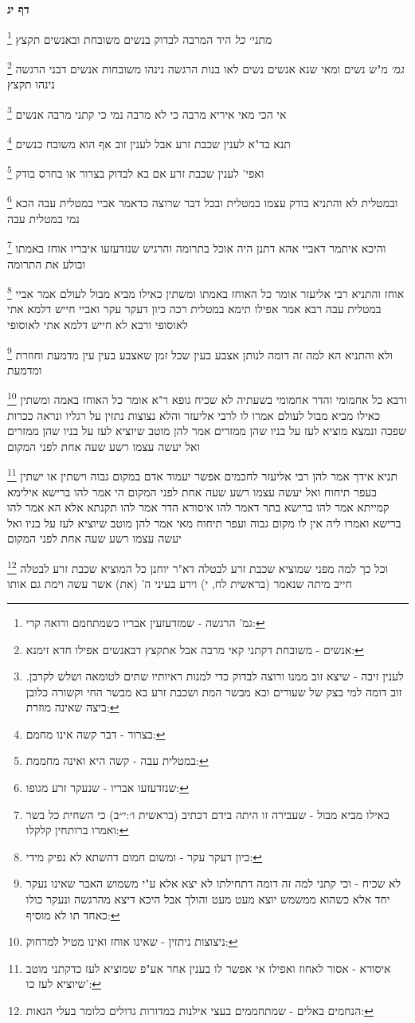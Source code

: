 \documentclass[12pt, openany]{book}
\newcommand{\sethebfont}{
\fontsize{10.5pt}{21.0pt} \selectfont
}
\newcommand{\twocol}[1]{
	{\sethebfont \begin{multicols}{2}
			#1
	\end{multicols}}	
}
\newcommand{\sectname}{}
\newcommand{\newsection}[1]{
	\renewcommand{\sectname}{#1}	
	\vspace{-\baselineskip}
	\begin{center}
		\textbf{%
\fontsize{16pt}{16pt}\selectfont
			#1}
	\end{center}
	\vspace{-\baselineskip}
	\nopagebreak
}
\newcommand{\footnotecomment}[1]{
	\renewcommand\thefootnote{}
	\footnote{#1}}
\newcommand{\commenta}[1]{\footnotecomment{#1}}
\begin{document}
\newsection{דף יג}
\twocol{
\commenta{גמ' הרגשה - שמזדעזעין אבריו כשמתחמם ורואה קרי:}
מתני׳ {\large\emph{כל}} היד המרבה לבדוק בנשים משובחת ובאנשים תקצץ
\commenta{אנשים - משובחת דקתני קאי מרבה אבל אתקצץ דבאנשים אפילו חדא זימנא:}
{\large\emph{גמ׳}} מ"ש נשים ומאי שנא אנשים נשים לאו בנות הרגשה נינהו משובחות אנשים דבני הרגשה נינהו תקצץ 
\commenta{לענין זיבה - שיצא זוב ממנו ורוצה לבדוק כדי למנות ראיותיו שתים לטומאה ושלש לקרבן. זוב דומה למי בצק של שעורים ובא מבשר המת ושכבת זרע בא מבשר החי וקשורה כלובן ביצה שאינה מוזרת:}
אי הכי מאי איריא מרבה כי לא מרבה נמי כי קתני מרבה אנשים 
\commenta{בצרור - דבר קשה אינו מחמם:}
תנא בד"א לענין שכבת זרע אבל לענין זוב אף הוא משובח כנשים 
\commenta{במטלית עבה - קשה היא ואינה מחממת:}
ואפי' לענין שכבת זרע אם בא לבדוק בצרור או בחרס בודק 
\commenta{שנזדעזעו אבריו - שנעקר זרע מגופו:}
ובמטלית לא והתניא בודק עצמו במטלית ובכל דבר שרוצה כדאמר אביי במטלית עבה הכא נמי במטלית עבה 
\commenta{כאילו מביא מבול - שעבירה זו היתה בידם דכתיב (בראשית ו׳:י״ב) כי השחית כל בשר ואמרו ברותחין קלקלו:}
והיכא איתמר דאביי אהא דתנן היה אוכל בתרומה והרגיש שנזדעזעו איבריו אוחז באמתו ובולע את התרומה 
\commenta{כיון דעקר עקר - ומשום חמום דהשתא לא נפיק מידי:}
אוחז והתניא רבי אליעזר אומר כל האוחז באמתו ומשתין כאילו מביא מבול לעולם אמר אביי במטלית עבה 
רבא אמר אפילו תימא במטלית רכה כיון דעקר עקר ואביי חייש דלמא אתי לאוסופי ורבא לא חייש דלמא אתי לאוסופי
\commenta{לא שכיח - וכי קתני למה זה דומה דתחילתו לא יצא אלא ע"י משמוש האבר שאינו נעקר יחד אלא כשהוא ממשמש יוצא מעט מעט והולך אבל היכא דיצא מהרגשה ונעקר כולו כאחד תו לא מוסיף:}
 ולא והתניא הא למה זה דומה לנותן אצבע בעין שכל זמן שאצבע בעין עין מדמעת וחוזרת ומדמעת 
\commenta{ניצוצות ניתזין - שאינו אוחז ואינו מטיל למרחוק:}
ורבא כל אחמומי והדר אחמומי בשעתיה לא שכיח 
גופא ר"א אומר כל האוחז באמה ומשתין כאילו מביא מבול לעולם אמרו לו לרבי אליעזר והלא נצוצות נתזין על רגליו ונראה ככרות שפכה ונמצא מוציא לעז על בניו שהן ממזרים 
אמר להן מוטב שיוציא לעז על בניו שהן ממזרים ואל יעשה עצמו רשע שעה אחת לפני המקום 
\commenta{איסורא - אסור לאחוז ואפילו אי אפשר לו בענין אחר אע"פ שמוציא לעז כדקתני מוטב שיוציא לעז כו':}
תניא אידך אמר להן רבי אליעזר לחכמים אפשר יעמוד אדם במקום גבוה וישתין או ישתין בעפר תיחוח ואל יעשה עצמו רשע שעה אחת לפני המקום 
הי אמר להו ברישא אילימא קמייתא אמר להו ברישא בתר דאמר להו איסורא הדר אמר להו תקנתא 
אלא הא אמר להו ברישא ואמרו ליה אין לו מקום גבוה ועפר תיחוח מאי אמר להן מוטב שיוציא לעז על בניו ואל יעשה עצמו רשע שעה אחת לפני המקום
\commenta{הנחמים באלים - שמתחממים בעצי אילנות במדורות גדולים כלומר בעלי הנאות:}
וכל כך למה מפני שמוציא שכבת זרע לבטלה דא"ר יוחנן כל המוציא שכבת זרע לבטלה חייב מיתה שנאמר (בראשית לח, י) וירע בעיני ה' (את) אשר עשה וימת גם אותו 
}
\end{document}
